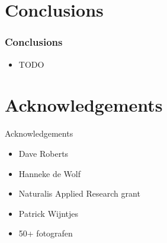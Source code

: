 \documentclass[]{beamer}
\begin{document}
\section{Conclusions}
    \begin{frame}
        \frametitle{Conclusions}

        \begin{itemize}
            \item {TODO}
        \end{itemize}
    \end{frame}


\section*{Acknowledgements}

    \begin{frame}{Acknowledgements}

        \begin{itemize}
            \item Dave Roberts
            \item Hanneke de Wolf
            \item Naturalis Applied Research grant
            \item Patrick Wijntjes
            \item 50+ fotografen
        \end{itemize}
    \end{frame}
\end{document}
